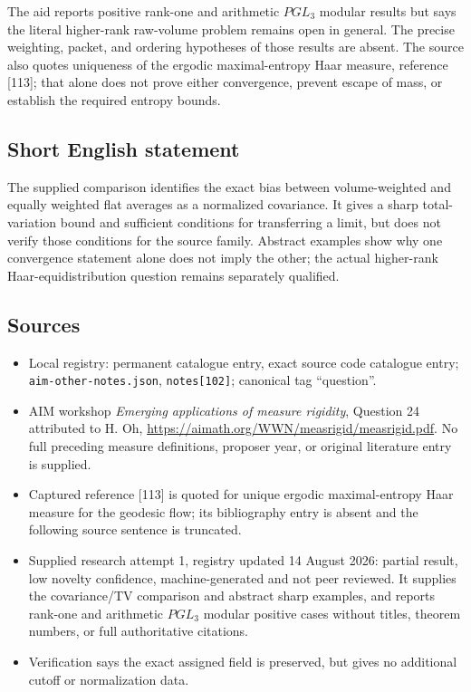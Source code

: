 \documentclass[11pt]{article}
\begin{document}
The aid reports positive rank-one and arithmetic $PGL_3$ modular results but says the literal higher-rank raw-volume problem remains open in general. The precise weighting, packet, and ordering hypotheses of those results are absent. The source also quotes uniqueness of the ergodic maximal-entropy Haar measure, reference [113]; that alone does not prove either convergence, prevent escape of mass, or establish the required entropy bounds.
\subsection{Short English statement}
The supplied comparison identifies the exact bias between volume-weighted and equally weighted flat averages as a normalized covariance. It gives a sharp total-variation bound and sufficient conditions for transferring a limit, but does not verify those conditions for the source family. Abstract examples show why one convergence statement alone does not imply the other; the actual higher-rank Haar-equidistribution question remains separately qualified.
\subsection{Sources}
\begin{itemize}
\item Local registry: permanent catalogue entry, exact source code catalogue entry; \texttt{aim-other-notes.json}, \texttt{notes[102]}; canonical tag ``question''.
\item AIM workshop \emph{Emerging applications of measure rigidity}, Question 24 attributed to H. Oh, \url{https://aimath.org/WWN/measrigid/measrigid.pdf}. No full preceding measure definitions, proposer year, or original literature entry is supplied.
\item Captured reference [113] is quoted for unique ergodic maximal-entropy Haar measure for the geodesic flow; its bibliography entry is absent and the following source sentence is truncated.
\item Supplied research attempt 1, registry updated 14 August 2026: partial result, low novelty confidence, machine-generated and not peer reviewed. It supplies the covariance/TV comparison and abstract sharp examples, and reports rank-one and arithmetic $PGL_3$ modular positive cases without titles, theorem numbers, or full authoritative citations.
\item Verification says the exact assigned field is preserved, but gives no additional cutoff or normalization data.
\end{itemize}
\end{document}
